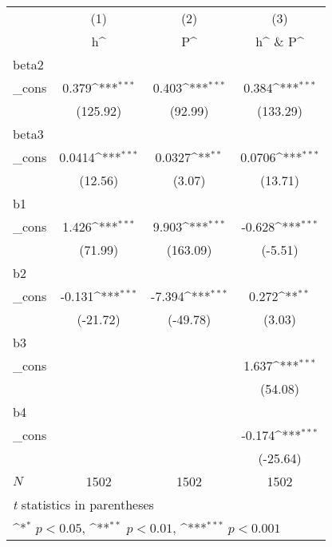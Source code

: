 {
\def\sym#1{\ifmmode^{#1}\else\(^{#1}\)\fi}
\begin{tabular}{l*{3}{c}}
\hline\hline
            &\multicolumn{1}{c}{(1)}&\multicolumn{1}{c}{(2)}&\multicolumn{1}{c}{(3)}\\
            &\multicolumn{1}{c}{h^}&\multicolumn{1}{c}{P^}&\multicolumn{1}{c}{h^ \& P^}\\
\hline
beta2       &                     &                     &                     \\
\_cons      &       0.379\sym{***}&       0.403\sym{***}&       0.384\sym{***}\\
            &    (125.92)         &     (92.99)         &    (133.29)         \\
\hline
beta3       &                     &                     &                     \\
\_cons      &      0.0414\sym{***}&      0.0327\sym{**} &      0.0706\sym{***}\\
            &     (12.56)         &      (3.07)         &     (13.71)         \\
\hline
b1          &                     &                     &                     \\
\_cons      &       1.426\sym{***}&       9.903\sym{***}&      -0.628\sym{***}\\
            &     (71.99)         &    (163.09)         &     (-5.51)         \\
\hline
b2          &                     &                     &                     \\
\_cons      &      -0.131\sym{***}&      -7.394\sym{***}&       0.272\sym{**} \\
            &    (-21.72)         &    (-49.78)         &      (3.03)         \\
\hline
b3          &                     &                     &                     \\
\_cons      &                     &                     &       1.637\sym{***}\\
            &                     &                     &     (54.08)         \\
\hline
b4          &                     &                     &                     \\
\_cons      &                     &                     &      -0.174\sym{***}\\
            &                     &                     &    (-25.64)         \\
\hline
\(N\)       &        1502         &        1502         &        1502         \\
\hline\hline
\multicolumn{4}{l}{\footnotesize \textit{t} statistics in parentheses}\\
\multicolumn{4}{l}{\footnotesize \sym{*} \(p<0.05\), \sym{**} \(p<0.01\), \sym{***} \(p<0.001\)}\\
\end{tabular}
}
